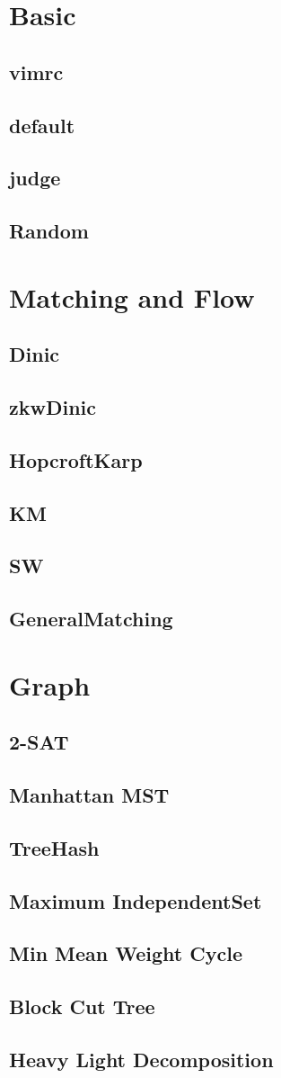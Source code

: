 \documentclass[a4paper,10pt,twocolumn,oneside]{article}
\begin{document}
\pagestyle{fancy}
\fancyfoot{}
\fancyhead[R]{\thepage}
\renewcommand{\headrulewidth}{0.4pt}
\renewcommand{\contentsname}{Contents} 

\scriptsize
\vspace{-2em}
\tableofcontents
\vspace{-1em}



\newcommand{\includecode}[2]{
  \subsection{#1}
  \vspace{-0.8em}
  
  \vspace{-1.2em}
}

\newcommand{\includetex}[2]{
  \subsection{#1}
  
  \vspace{-1.2em}
}

\newcommand{\sectiontitle}[1]{
  \section{#1}
  \vspace{-0.5em}
}



\sectiontitle{Basic}
\includecode{vimrc}{../code/Basic/vimrc}
\includecode{default}{../code/Basic/default.cpp}
\includecode{judge}{../code/Basic/judge.sh}
\includecode{Random}{../code/Basic/Random.cpp}

\sectiontitle{Matching and Flow}
\includecode{Dinic}{../code/Flow/Dinic.cpp}
\includecode{zkwDinic}{../code/Flow/zkwDinic.cpp}
\includecode{HopcroftKarp}{../code/Flow/HopcroftKarp.cpp}
\includecode{KM}{../code/Flow/KM.cpp}
\includecode{SW}{../code/Flow/SW.cpp}
\includecode{GeneralMatching}{../code/Flow/GeneralMatching.cpp}

\sectiontitle{Graph}
\includecode{2-SAT}{../code/Graph/TwoSAT.cpp}
\includecode{Manhattan MST}{../code/Graph/ManhattanMST.cpp}
\includecode{TreeHash}{../code/Graph/TreeHash.cpp}
\includecode{Maximum IndependentSet}{../code/Graph/MaximumIndependentSet.cpp}
\includecode{Min Mean Weight Cycle}{../code/Graph/MinMeanWeightCycle.cpp}
\includecode{Block Cut Tree}{../code/Graph/BlockCutTree.cpp}
\includecode{Heavy Light Decomposition}{../code/Graph/HeavyLightDecomposition.cpp}
\end{document}

